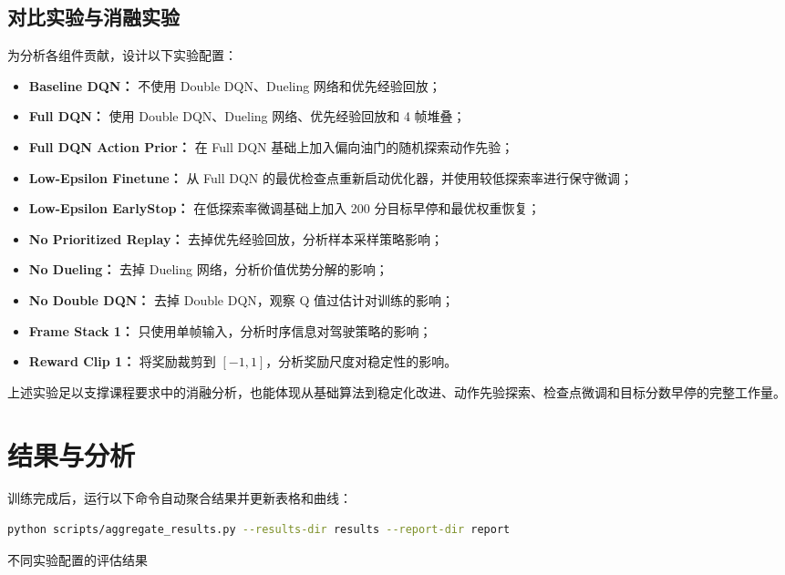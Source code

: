 \documentclass[UTF8,a4paper,12pt]{ctexart}
\begin{document}
\subsection{对比实验与消融实验}

为分析各组件贡献，设计以下实验配置：

\begin{itemize}
  \item \textbf{Baseline DQN：} 不使用 Double DQN、Dueling 网络和优先经验回放；
  \item \textbf{Full DQN：} 使用 Double DQN、Dueling 网络、优先经验回放和 4 帧堆叠；
  \item \textbf{Full DQN Action Prior：} 在 Full DQN 基础上加入偏向油门的随机探索动作先验；
  \item \textbf{Low-Epsilon Finetune：} 从 Full DQN 的最优检查点重新启动优化器，并使用较低探索率进行保守微调；
  \item \textbf{Low-Epsilon EarlyStop：} 在低探索率微调基础上加入 200 分目标早停和最优权重恢复；
  \item \textbf{No Prioritized Replay：} 去掉优先经验回放，分析样本采样策略影响；
  \item \textbf{No Dueling：} 去掉 Dueling 网络，分析价值优势分解的影响；
  \item \textbf{No Double DQN：} 去掉 Double DQN，观察 Q 值过估计对训练的影响；
  \item \textbf{Frame Stack 1：} 只使用单帧输入，分析时序信息对驾驶策略的影响；
  \item \textbf{Reward Clip 1：} 将奖励裁剪到 $[-1,1]$，分析奖励尺度对稳定性的影响。
\end{itemize}

上述实验足以支撑课程要求中的消融分析，也能体现从基础算法到稳定化改进、动作先验探索、检查点微调和目标分数早停的完整工作量。

\section{结果与分析}

训练完成后，运行以下命令自动聚合结果并更新表格和曲线：

\begin{lstlisting}[language=bash]
python scripts/aggregate_results.py --results-dir results --report-dir report
\end{lstlisting}

\begin{table}[htbp]
\centering
\caption{不同实验配置的评估结果}

\label{tab:results}
\end{table}
\end{document}
